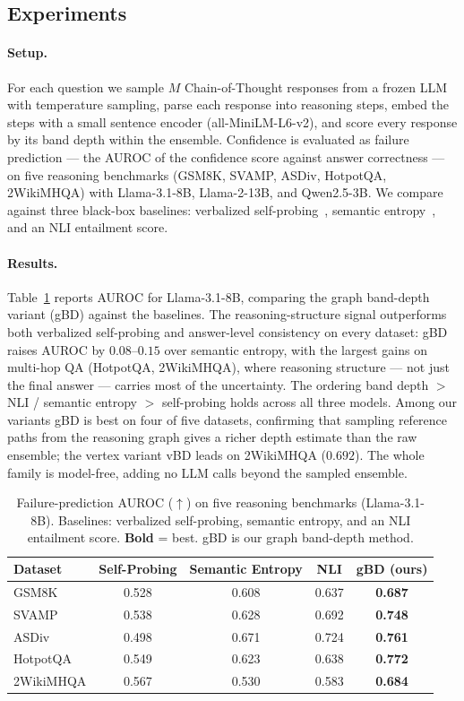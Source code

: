 \documentclass[11pt]{article}
\begin{document}
\subsection{Experiments}
\paragraph{Setup.} For each question we sample $M$ Chain-of-Thought responses from a frozen LLM
with temperature sampling, parse each response into reasoning steps, embed the steps with a small
sentence encoder (all-MiniLM-L6-v2), and score every response by its band depth within the
ensemble. Confidence is evaluated as failure prediction --- the AUROC of the confidence score
against answer correctness --- on five reasoning benchmarks (GSM8K, SVAMP, ASDiv, HotpotQA,
2WikiMHQA) with Llama-3.1-8B, Llama-2-13B, and Qwen2.5-3B. We compare against three black-box baselines:
verbalized self-probing~\cite{xiong2024llms}, semantic
entropy~\cite{kuhn2023semantic,farquhar2024detecting}, and an NLI entailment score.

\paragraph{Results.} Table~\ref{tab:llm_uq} reports AUROC for Llama-3.1-8B, comparing the graph
band-depth variant (gBD) against the baselines. The reasoning-structure signal outperforms both
verbalized self-probing and answer-level consistency on every dataset: gBD raises AUROC by
$0.08$--$0.15$ over semantic entropy, with the largest gains on multi-hop QA (HotpotQA, 2WikiMHQA),
where reasoning structure --- not just the final answer --- carries most of the uncertainty. The
ordering band depth $>$ NLI / semantic entropy $>$ self-probing holds across all three models. Among our
variants gBD is best on four of five datasets, confirming that sampling reference paths from the
reasoning graph gives a richer depth estimate than the raw ensemble; the vertex variant vBD leads
on 2WikiMHQA ($0.692$). The whole family is model-free, adding no LLM calls beyond the sampled
ensemble.

\begin{table}[ht]
\centering
\caption{Failure-prediction AUROC ($\uparrow$) on five reasoning benchmarks (Llama-3.1-8B).
Baselines: verbalized self-probing, semantic entropy, and an NLI entailment score. \textbf{Bold} =
best. gBD is our graph band-depth method.}
\label{tab:llm_uq}
\small
\begin{tabular}{lcccc}
\toprule
Dataset & Self-Probing & Semantic Entropy & NLI & gBD (ours) \\
\midrule
GSM8K     & 0.528 & 0.608 & 0.637 & \textbf{0.687} \\
SVAMP     & 0.538 & 0.628 & 0.692 & \textbf{0.748} \\
ASDiv     & 0.498 & 0.671 & 0.724 & \textbf{0.761} \\
HotpotQA  & 0.549 & 0.623 & 0.638 & \textbf{0.772} \\
2WikiMHQA & 0.567 & 0.530 & 0.583 & \textbf{0.684} \\
\bottomrule
\end{tabular}
\end{table}
\end{document}
